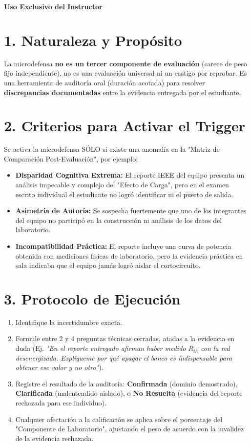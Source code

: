 \documentclass[11pt, a4paper]{article}
\begin{document}
\begin{tcolorbox}[colback=ucbblue!5!white, colframe=ucbblue, title=\textbf{Guía de Ejecución: Auditoría por Microdefensa}]
    \centering \textbf{Uso Exclusivo del Instructor}
\end{tcolorbox}

\section*{1. Naturaleza y Propósito}
La microdefensa \textbf{no es un tercer componente de evaluación} (carece de peso fijo independiente), no es una evaluación universal ni un castigo por reprobar. Es una herramienta de auditoría oral (duración acotada) para resolver \textbf{discrepancias documentadas} entre la evidencia entregada por el estudiante.

\section*{2. Criterios para Activar el Trigger}
Se activa la microdefensa SÓLO si existe una anomalía en la "Matriz de Comparación Post-Evaluación", por ejemplo:
\begin{itemize}
    \item \textbf{Disparidad Cognitiva Extrema:} El reporte IEEE del equipo presenta un análisis impecable y complejo del "Efecto de Carga", pero en el examen escrito individual el estudiante no logró identificar ni el puerto de salida.
    \item \textbf{Asimetría de Autoría:} Se sospecha fuertemente que uno de los integrantes del equipo no participó en la construcción ni análisis de los datos del laboratorio.
    \item \textbf{Incompatibilidad Práctica:} El reporte incluye una curva de potencia obtenida con mediciones físicas de laboratorio, pero la evidencia práctica en sala indicaba que el equipo jamás logró aislar el cortocircuito.
\end{itemize}

\section*{3. Protocolo de Ejecución}
\begin{enumerate}
    \item Identifique la incertidumbre exacta.
    \item Formule entre 2 y 4 preguntas técnicas cerradas, atadas a la evidencia en duda (Ej. \textit{"En el reporte entregado afirman haber medido $R_{th}$ con la red desenergizada. Explíqueme por qué apagar el banco es indispensable para obtener ese valor y no otro"}).
    \item Registre el resultado de la auditoría: \textbf{Confirmada} (dominio demostrado), \textbf{Clarificada} (malentendido aislado), o \textbf{No Resuelta} (evidencia del reporte rechazada para ese individuo).
    \item Cualquier afectación a la calificación se aplica sobre el porcentaje del "Componente de Laboratorio", ajustando el peso de acuerdo con la invalidez de la evidencia rechazada.
\end{enumerate}
\end{document}
